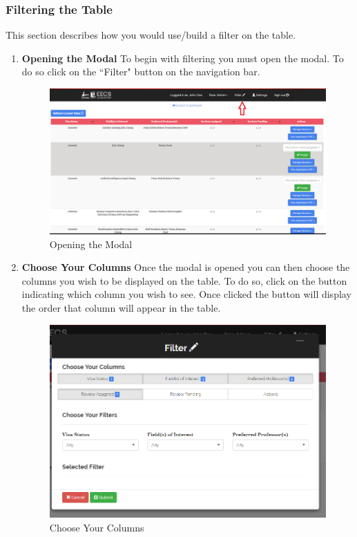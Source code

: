 \documentclass[fontsize=12pt,paper=letter,twoside]{scrartcl}
\begin{document}
\clearpage
\subsubsection{Filtering the Table}
This section describes how you would use/build a filter on the table.

\begin{enumerate}

\item \textbf{Opening the Modal} To begin with filtering you must open the modal. To do so click on the ``Filter" button on the navigation bar.

\begin{figure}[!htb]
\begin{center}
\includegraphics[width=.99\textwidth]{images/adm/mr/open_modal.png}
\end{center}
\caption{Opening the  Modal}
\label{fig:adm/open_modal}
\end{figure}

\clearpage
\newpage
\item \textbf{Choose Your Columns} Once the modal is opened you can then choose the columns you wish to be displayed on the table. To do so, click on the button indicating which column you wish to see. Once clicked the button will display the order that column will appear in the table.

\begin{figure}[!htb]
\begin{center}
\includegraphics[width=.99\textwidth]{images/adm/mr/selected_col.png}
\end{center}
\caption{Choose Your Columns}
\label{fig:adm/choose_columns}
\end{figure}


\end{enumerate}
\end{document}
